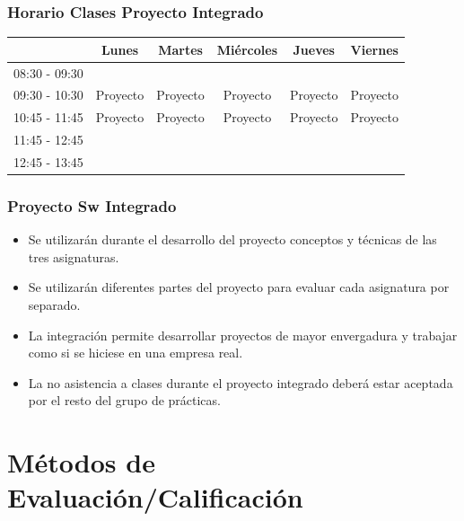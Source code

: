 \documentclass[animated,a4paper,slidestop,xcolor=pst,blue]{beamer}
\begin{document}
\begin{frame}[c]
	\frametitle{Horario Clases Proyecto Integrado}
	\begin{small}
	\begin{center}
	\begin{tabular}{||l|c|c|c|c|c||}
	\hline \hline
				   & Lunes     & Martes   & Miércoles & Jueves   & Viernes  \\ \hline \hline
    08:30 - 09:30  &           &          &           &          &          \\ \hline
    09:30 - 10:30  & Proyecto  & Proyecto & Proyecto  & Proyecto & Proyecto \\ \hline
    10:45 - 11:45  & Proyecto  & Proyecto & Proyecto  & Proyecto & Proyecto \\ \hline
	11:45 - 12:45  &           &          &           &          &          \\ \hline
	12:45 - 13:45  &           &          &           &          &          \\ \hline \hline
	\end{tabular}
	\end{center}
	\end{small}
\end{frame}

\begin{frame}[c]
	\frametitle{Proyecto Sw Integrado}
	\begin{itemize}[<+->]
        \item Se utilizarán durante el desarrollo del proyecto conceptos y técnicas de las tres asignaturas.
        \item Se utilizarán diferentes partes del proyecto para evaluar cada asignatura por separado.
        \item La integración permite desarrollar proyectos de mayor envergadura y trabajar como si se hiciese en una empresa real.
        \item La no asistencia a clases durante el proyecto integrado deberá estar aceptada por el resto del grupo de prácticas.
	\end{itemize}
\end{frame}

\section{Métodos de Evaluación/Calificación}
\end{document}
